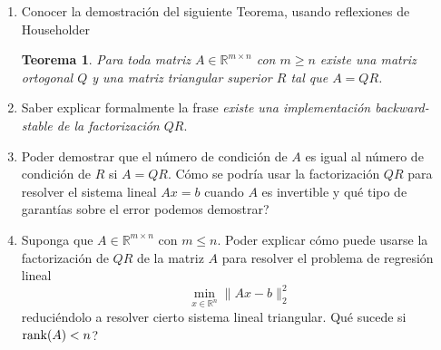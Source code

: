 \documentclass[12pt]{amsart}
\newtheorem{theorem}[lemma]{Teorema}
\theoremstyle{definition}
\renewcommand{\geq}{\geqslant}
\renewcommand{\leq}{\leqslant}
\newcommand{\RR}{\ensuremath{\mathbb{R}}}
\begin{document}
\begin{enumerate}
\begin{enumerate}
\item Conocer la demostración del siguiente Teorema, usando reflexiones de Householder
\begin{theorem} Para toda matriz $A\in \RR^{m\times n}$ con $m\geq n$ existe una matriz ortogonal $Q$ y una matriz triangular superior $R$ tal que $A=QR$.
\end{theorem}

\item Saber explicar formalmente la frase {\it existe una implementación backward-stable de la factorización $QR$}.

\item Poder demostrar que el número de condición de $A$ es igual al número de condición de $R$ si $A=QR$. Cómo se podría usar la factorización $QR$ para resolver el sistema lineal $Ax=b$ cuando $A$ es invertible y qué tipo de garantías sobre el error podemos demostrar?

\item Suponga que $A\in \RR^{m\times n}$ con $m\leq n$. Poder explicar cómo puede usarse la factorización de $QR$ de la matriz $A$ para resolver el problema de regresión lineal
\[\min_{x\in \RR^n} \|Ax-b\|_2^2\]
reduciéndolo a resolver cierto sistema lineal triangular. Qué sucede si ${\rm rank}(A)<n$?

\end{enumerate}


\end{enumerate}
\end{document}
